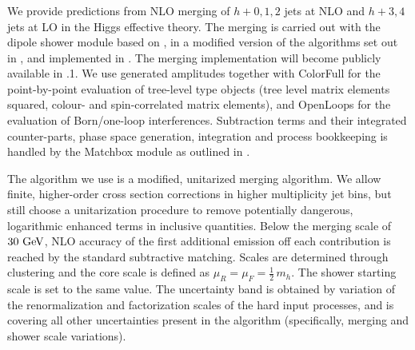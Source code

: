 \subsubsection{\Herwig}
\label{sec:hjetscomp:tools:mc:herwig}

We provide predictions from NLO merging of $h+0,1,2$ jets at NLO and $h+3,4$
jets at LO in the Higgs effective theory. The merging is carried out with the
\Herwig \ \cite{Bellm:2015jjp} dipole shower module based on
\cite{Platzer:2009jq,Platzer:2011bc}, in a modified version of the algorithms
set out in \cite{Platzer:2012bs,Lonnblad:2012ix}, and implemented in
\cite{Bellm:thesis,Bellm:2016xxx}. The merging implementation will become
publicly available in \Herwig{}.1. We use \MGaMC
\cite{Alwall:2014hca} generated amplitudes together with \textsf{ColorFull}
\cite{Sjodahl:2014opa} for the point-by-point evaluation of tree-level type
objects (tree level matrix elements squared, colour- and spin-correlated
matrix elements), and \textsf{OpenLoops} \cite{Cascioli:2011va} for the
evaluation of Born/one-loop interferences.  Subtraction terms and their
integrated counter-parts, phase space generation, integration and process
bookkeeping is handled by the \textsf{Matchbox} module as outlined in
\cite{Bellm:2015jjp}.

The algorithm we use is a modified, unitarized merging algorithm. We allow
finite, higher-order cross section corrections in higher multiplicity jet
bins, but still choose a unitarization procedure to remove potentially
dangerous, logarithmic enhanced terms in inclusive quantities. Below the
merging scale of $30\ {\rm GeV}$, NLO accuracy of the first additional
emission off each contribution is reached by the standard subtractive
matching. Scales are determined through clustering and the core scale 
is defined as $\mu_R=\mu_F=\tfrac{1}{2}\,m_h$. The shower starting scale 
is set to the same value. The uncertainty band is obtained by variation of 
the renormalization and factorization scales of the hard input processes, 
and is covering all other uncertainties present in the algorithm 
(specifically, merging and shower scale variations).
